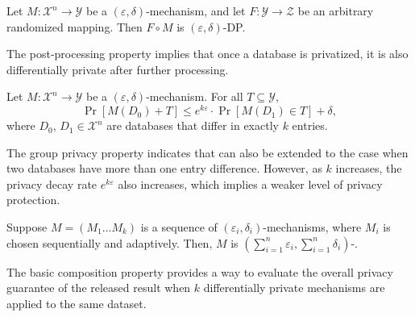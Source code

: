 \begin{prop} Let $M:\mathcal{X}^{n} \rightarrow \mathcal{Y}$ be a $\left(\varepsilon,\delta \right)  $-\differentialprivacy mechanism, and let $F:\mathcal{Y}\rightarrow \mathcal{Z}$ be an arbitrary randomized mapping. Then $F\circ M$ is $\left(\varepsilon,\delta\right)  $-DP.
    \label{prop:Post-Processing}
\end{prop}
The post-processing property implies that once a database is privatized, it is also differentially private after further processing.

\begin{prop} Let $M:\mathcal{X}^{n} \rightarrow \mathcal{Y}$ be a $\left( \varepsilon ,\delta \right)$-\differentialprivacy mechanism. For all $T\subseteq \mathcal{Y}$,
    \[\Pr \left[ M\left(D_{0}\right) +T\right] \leq e^{k \varepsilon}\cdot \Pr \left[ M\left( D_{1}\right) \in T\right] +\delta, \]
    where $D_{0}$, $D_{1}\in \mathcal{X}^{n}$ are databases that differ in exactly $k$ entries.
\end{prop}

The group privacy property indicates that \differentialprivacy can also be extended to the case when two databases have more than one entry difference. However, as $k$ increases, the privacy decay rate $e^{k\varepsilon}$ also increases, which implies a weaker level of privacy protection.

\begin{prop}
    Suppose $M=\left( M_{1}\ldots M_{k}\right)$  is a sequence of $\left( \varepsilon_{i} ,\delta_{i} \right)$-\differentialprivacy mechanisms, where $M_{i}$ is chosen sequentially and adaptively. Then, $M$ is $\left(\sum_{i=1}^n\varepsilon_{i} ,\sum_{i=1}^n\delta_{i} \right)$-\differentialprivacy.
\end{prop}

The basic composition property provides a way to evaluate the overall privacy guarantee of the released result when $k$ differentially private mechanisms are applied to the same dataset.

